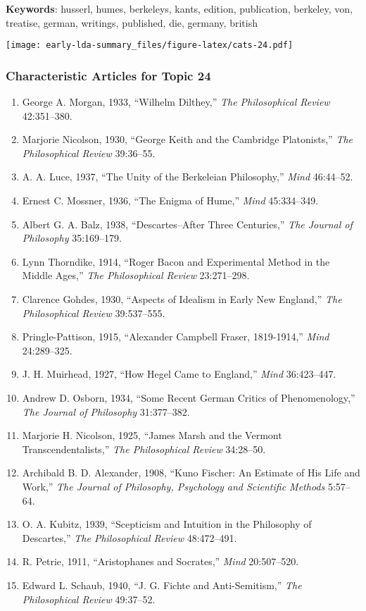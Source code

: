 \documentclass[
]{article}
\begin{document}
\textbf{Keywords}: husserl, humes, berkeleys, kants, edition,
publication, berkeley, von, treatise, german, writings, published, die,
germany, british

\texttt{[image: early-lda-summary\_files/figure-latex/cats-24.pdf]}
\newpage 

\hypertarget{characteristic-articles-for-topic-24}{%
\subsubsection{Characteristic Articles for Topic
24}\label{characteristic-articles-for-topic-24}}

\begin{enumerate}
\def\labelenumi{\arabic{enumi}.}
\item
  George A. Morgan, 1933, ``Wilhelm Dilthey,'' \emph{The Philosophical
  Review} 42:351--380.
\item
  Marjorie Nicolson, 1930, ``George Keith and the Cambridge
  Platonists,'' \emph{The Philosophical Review} 39:36--55.
\item
  A. A. Luce, 1937, ``The Unity of the Berkeleian Philosophy,''
  \emph{Mind} 46:44--52.
\item
  Ernest C. Mossner, 1936, ``The Enigma of Hume,'' \emph{Mind}
  45:334--349.
\item
  Albert G. A. Balz, 1938, ``Descartes--After Three Centuries,''
  \emph{The Journal of Philosophy} 35:169--179.
\item
  Lynn Thorndike, 1914, ``Roger Bacon and Experimental Method in the
  Middle Ages,'' \emph{The Philosophical Review} 23:271--298.
\item
  Clarence Gohdes, 1930, ``Aspects of Idealism in Early New England,''
  \emph{The Philosophical Review} 39:537--555.
\item
  Pringle-Pattison, 1915, ``Alexander Campbell Fraser, 1819-1914,''
  \emph{Mind} 24:289--325.
\item
  J. H. Muirhead, 1927, ``How Hegel Came to England,'' \emph{Mind}
  36:423--447.
\item
  Andrew D. Osborn, 1934, ``Some Recent German Critics of
  Phenomenology,'' \emph{The Journal of Philosophy} 31:377--382.
\item
  Marjorie H. Nicolson, 1925, ``James Marsh and the Vermont
  Transcendentalists,'' \emph{The Philosophical Review} 34:28--50.
\item
  Archibald B. D. Alexander, 1908, ``Kuno Fischer: An Estimate of His
  Life and Work,'' \emph{The Journal of Philosophy, Psychology and
  Scientific Methods} 5:57--64.
\item
  O. A. Kubitz, 1939, ``Scepticism and Intuition in the Philosophy of
  Descartes,'' \emph{The Philosophical Review} 48:472--491.
\item
  R. Petrie, 1911, ``Aristophanes and Socrates,'' \emph{Mind}
  20:507--520.
\item
  Edward L. Schaub, 1940, ``J. G. Fichte and Anti-Semitism,'' \emph{The
  Philosophical Review} 49:37--52.
\end{enumerate}
\end{document}
